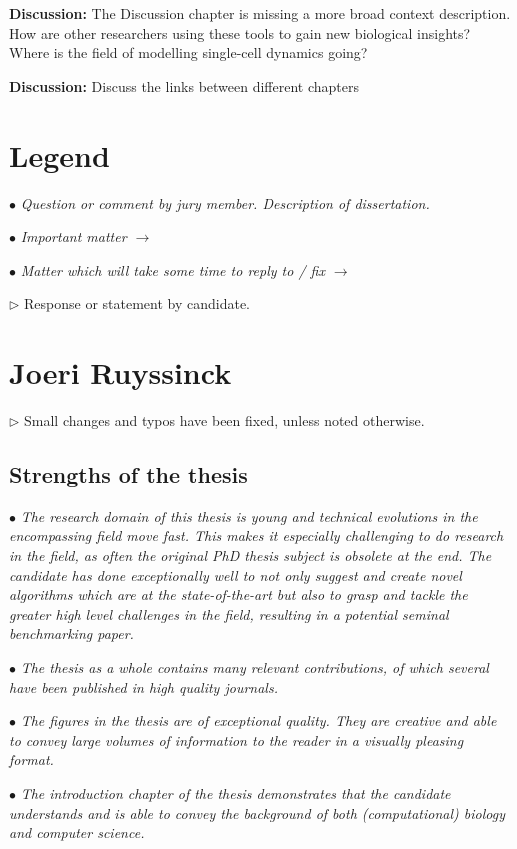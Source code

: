 \documentclass[10pt]{article}
\newcommand{\exam}[2][\  ]{\hspace{0pt}\marginpar{\color{red}#1}$\bullet$ \textit{#2}}
\newcommand{\imp}[1]{{\color{red} #1}}
\newcommand{\nimp}[1]{{\color{gray} #1}}
\newcommand{\answ}[1]{{\color{blue} $\triangleright$ #1}}
\newcommand{\bigexclaim}{\raisebox{-0.1em}{\BigTriangleUp}\hspace{-0.32em}\llap{\small\textbf{!}}\hspace{0.32em}}
\newcommand{\tagimp}{\bigexclaim}
\newcommand{\tagtime}{{\Large $\hourglass$}}
\begin{document}
{\textbf{Discussion:} {The Discussion chapter is missing a more broad context
			description. How are other researchers using these tools to gain new biological insights? Where is the field of modelling single-cell dynamics going?}
		
\textbf{Discussion:} {Discuss the links between different chapters}


\newpage
\section{Legend}
\exam{Question or comment by jury member. \nimp{Description of dissertation.}}

\exam[\tagimp]{\imp{Important matter} $\rightarrow$}

\exam[\tagtime]{Matter which will take some time to reply to / fix $\rightarrow$}

\answ{Response or statement by candidate.}


\section{Joeri Ruyssinck}

\answ{Small changes and typos have been fixed, unless noted otherwise.}

\subsection{Strengths of the thesis}

\exam{\nimp{The research domain of this thesis is young and technical evolutions in the
	encompassing field move fast. This makes it especially challenging to do
	research in the field, as often the original PhD thesis subject is obsolete at the
	end. The candidate has done exceptionally well to not only suggest and create
	novel algorithms which are at the state-of-the-art but also to grasp and tackle
	the greater high level challenges in the field, resulting in a potential seminal
	benchmarking paper.}}

\exam{\nimp{The thesis as a whole contains many relevant contributions, of which several
	have been published in high quality journals.}}

\exam{\nimp{The figures in the thesis are of exceptional quality. They are creative and able
	to convey large volumes of information to the reader in a visually pleasing
	format.}}

\exam{\nimp{The introduction chapter of the thesis demonstrates that the candidate
	understands and is able to convey the background of both (computational)
	biology and computer science.}}

}
\end{document}
